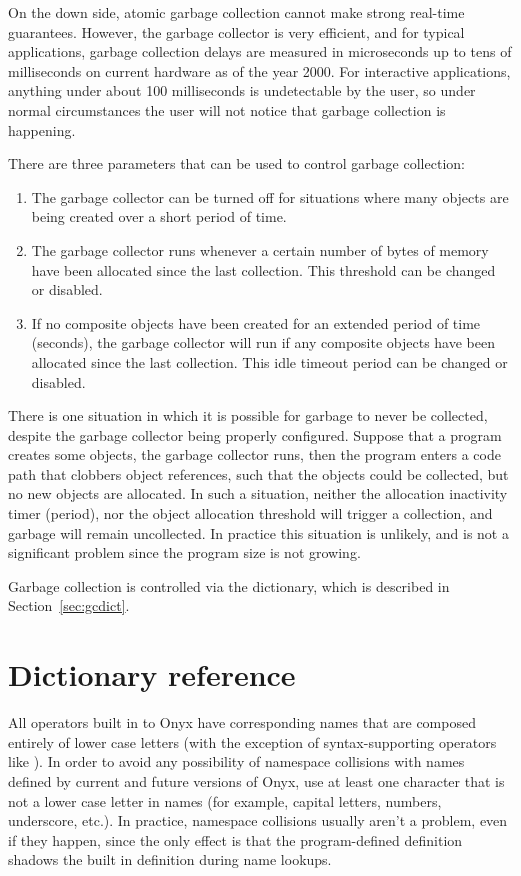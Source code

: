 On the down side, atomic garbage collection cannot make strong real-time
guarantees.  However, the garbage collector is very efficient, and for typical
applications, garbage collection delays are measured in microseconds up to tens
of milliseconds on current hardware as of the year 2000.  For interactive
applications, anything under about 100 milliseconds is undetectable by the user,
so under normal circumstances the user will not notice that garbage collection
is happening.

There are three parameters that can be used to control garbage collection:
\begin{enumerate}
\item{The garbage collector can be turned off for situations where many objects
are being created over a short period of time.}
\item{The garbage collector runs whenever a certain number of bytes of memory
have been allocated since the last collection.  This threshold can be changed or
disabled.}
\item{If no composite objects have been created for an extended period of time
(seconds), the garbage collector will run if any composite objects have been
allocated since the last collection.  This idle timeout period can be changed or
disabled.}
\end{enumerate}

There is one situation in which it is possible for garbage to never be
collected, despite the garbage collector being properly configured.  Suppose
that a program creates some objects, the garbage collector runs, then the
program enters a code path that clobbers object references, such that the
objects could be collected, but no new objects are allocated.  In such a
situation, neither the allocation inactivity timer (period), nor the object
allocation threshold will trigger a collection, and garbage will remain
uncollected.  In practice this situation is unlikely, and is not a significant
problem since the program size is not growing.

Garbage collection is controlled via the 
dictionary, which is described in Section~\ref{sec:gcdict}.

\section{Dictionary reference}

All operators built in to Onyx have corresponding names that are composed
entirely of lower case letters (with the exception of syntax-supporting
operators like {\lb}).  In order to avoid any possibility of namespace
collisions with names defined by current and future versions of Onyx, use at
least one character that is not a lower case letter in names (for example,
capital letters, numbers, underscore, etc.).  In practice, namespace collisions
usually aren't a problem, even if they happen, since the only effect is that the
program-defined definition shadows the built in definition during name lookups.

